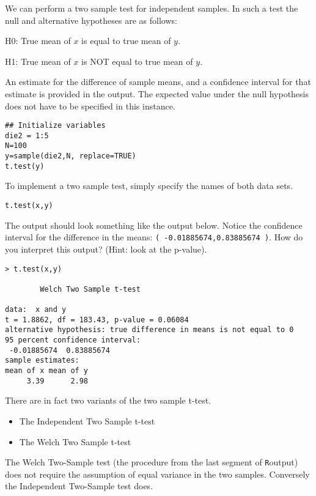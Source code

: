 We can perform a two sample test for independent samples. In such a test the null and alternative hypotheses are as follows:

H0: True mean of $x$ is equal to true mean of $y$.

H1: True mean of $x$ is NOT equal to true mean of $y$.

An estimate for the difference of sample means, and a confidence interval for that estimate is provided in the output. The expected value under the null hypothesis does not have to be specified in this instance.

\begin{framed}
\begin{verbatim}
## Initialize variables
die2 = 1:5
N=100
y=sample(die2,N, replace=TRUE)
t.test(y)
\end{verbatim}
\end{framed}

To implement a two sample test, simply specify the names of both data sets.

\begin{framed}
\begin{verbatim}
t.test(x,y)
\end{verbatim}
\end{framed}
The output should look something like the output below. Notice the confidence interval for the difference in the means: \texttt{( -0.01885674,0.83885674 )}.
How do you interpret this output? (Hint: look at the p-value).

\begin{verbatim}
> t.test(x,y)

        Welch Two Sample t-test

data:  x and y
t = 1.8862, df = 183.43, p-value = 0.06084
alternative hypothesis: true difference in means is not equal to 0
95 percent confidence interval:
 -0.01885674  0.83885674
sample estimates:
mean of x mean of y
     3.39      2.98
\end{verbatim}
There are in fact two variants of the two sample t-test.
\begin{itemize}
\item The Independent Two Sample t-test
\item The Welch Two Sample t-test
\end{itemize}
The Welch Two-Sample test (the procedure from the last segment of \texttt{R}output) does not require the assumption of equal variance in the two samples. Conversely the Independent Two-Sample test does.

